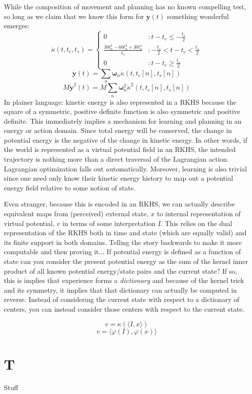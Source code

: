 \documentclass[10pt]{article}
\begin{document}
While the composition of movement and planning has no known compelling test, so long as we claim that we know this form for $\dot{\boldsymbol{y}}(t)$ something wonderful emerges:
\begin{equation}
\dot{\kappa}(t,t_c,t_s)=
  \begin{cases}
  0 & : t-t_c \leq -\frac{t_s}{2}\\
  \frac{30t_n^2-60t_n^3+30t_n^4}{t_s} & : -\frac{t_s}{2} < t-t_c < \frac{t_s}{2}\\
  0 & : t-t_c \geq \frac{t_s}{2}
  \end{cases}
\end{equation}
\begin{equation}
\dot{\boldsymbol{y}}(t)=\sum_n \boldsymbol{\omega}_n \dot{\kappa}(t,t_c[n],t_s[n])
\end{equation}
\begin{equation}
M\dot{\boldsymbol{y}}^2(t)=M \sum_n \boldsymbol{\omega}^2_n \dot{\kappa}^2(t,t_c[n],t_s[n])
\end{equation}
In plainer language: kinetic energy is also represented in a RKHS because the square of a symmetric, positive definite function is also symmetric and positive definite. This immediately implies a mechanism for learning and planning in an energy or action domain. Since total energy will be conserved, the change in potential energy is the negative of the change in kinetic energy. In other words, if the world is represented as a virtual potential field in an RKHS, the intended trajectory is nothing more than a direct traversal of the Lagrangian action. Lagrangian optimization falls out automatically. Moreover, learning is also trivial since one need only know their kinetic energy history to map out a potential energy field relative to some notion of state.

Even stranger, because this is encoded in an RKHS, we can actually describe equivalent maps from (perceived) external state, $x$ to internal representation of virtual potential, $v$ in terms of some interpretation $I$. This relies on the dual representation of the RKHS both in time and state (which are equally valid) and its finite support in both domains. Telling the story backwards to make it more computable and then proving it...
	If potential energy is defined as a function of state can you consider the present potential energy as the sum of the kernel inner product of all known potential energy/state pairs and the current state? If so, this is implies that experience forms a \textit{dictionary} and because of the kernel trick and its symmetry, it implies that that dictionary can actually be computed in reverse. Instead of considering the current state with respect to a dictionary of centers, you can instead consider those centers with respect to the current state.


\begin{equation}
v=\kappa(\langle I,x \rangle)
\end{equation}
\begin{equation}
v=\langle\varphi(I),\varphi(x)\rangle
\end{equation}



 





\section*{T}
Stuff
\end{document}
